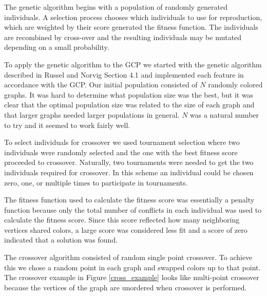 \documentclass{article}
\begin{document}
	The genetic algorithm begins with a population of randomly generated individuals. A selection process chooses which individuals to use for reproduction, which are weighted by their score generated the fitness function. The individuals are recombined by cross-over and the resulting individuals may be mutated depending on a small probability.
	
	To apply the genetic algorithm to the GCP we started with the genetic algorithm described in Russel and Norvig Section 4.1\cite{ai} and implemented each feature in accordance with the GCP. Our initial population consisted of $N$ randomly colored graphs. It was hard to determine what population size was the best, but it was clear that the optimal population size was related to the size of each graph and that larger graphs needed larger populations in general. $N$ was a natural number to try and it seemed to work fairly well.
	
	
	
	To select individuals for crossover we used tournament selection where two individuals were randomly selected and the one with the best fitness score  proceeded to crossover. Naturally, two tournaments were needed to get the two individuals required for crossover. In this scheme an individual could be chosen zero, one, or multiple times to participate in tournaments.
	
	The fitness function used to calculate the fitness score was essentially a penalty function because only the total number of conflicts in each individual was used to calculate the fitness score. Since this score reflected how many neighboring vertices shared colors, a large score was considered less fit and a score of zero indicated that a solution was found. 
	
	The crossover algorithm consisted of random single point crossover. To achieve this we chose a random point in each graph and swapped colors up to that point. The crossover example in Figure \ref{cross_example} looks like multi-point crossover because the vertices of the graph are unordered when crossover is performed.
	
	
	
	
	
\end{document}
